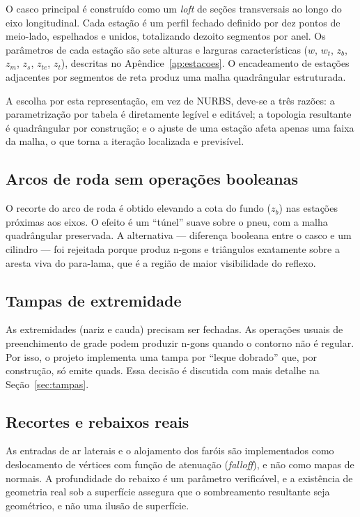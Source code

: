 O casco principal \'e constru\'ido como um \emph{loft} de se{\c{c}}\~oes transversais ao longo do
eixo longitudinal. Cada esta{\c{c}}\~ao \'e um perfil fechado definido por dez pontos de
meio-lado, espelhados e unidos, totalizando dezoito segmentos por anel. Os par\^ametros de cada
esta{\c{c}}\~ao s\~ao sete alturas e larguras caracter\'isticas ($w$, $w_t$, $z_b$, $z_m$,
$z_s$, $z_{te}$, $z_t$), descritas no Ap\^endice~\ref{ap:estacoes}. O encadeamento de
esta{\c{c}}\~oes adjacentes por segmentos de reta produz uma malha quadr\^angular
estruturada.

A escolha por esta representa{\c{c}}\~ao, em vez de NURBS, deve-se a tr\^es raz\~oes: a
parametriza{\c{c}}\~ao por tabela \'e diretamente leg\'ivel e edit\'avel; a topologia
resultante \'e quadr\^angular por constru{\c{c}}\~ao; e o ajuste de uma esta{\c{c}}\~ao afeta
apenas uma faixa da malha, o que torna a itera{\c{c}}\~ao localizada e previs\'ivel.

\subsection{Arcos de roda sem opera{\c{c}}\~oes booleanas}

O recorte do arco de roda \'e obtido elevando a cota do fundo ($z_b$) nas esta{\c{c}}\~oes
pr\'oximas aos eixos. O efeito \'e um ``t\'unel'' suave sobre o pneu, com a malha
quadr\^angular preservada. A alternativa --- diferen{\c{c}}a booleana entre o casco e um cilindro
--- foi rejeitada porque produz n-gons e tri\^angulos exatamente sobre a aresta viva do
para-lama, que \'e a regi\~ao de maior visibilidade do reflexo.

\subsection{Tampas de extremidade}

As extremidades (nariz e cauda) precisam ser fechadas. As opera{\c{c}}\~oes usuais de
preenchimento de grade podem produzir n-gons quando o contorno n\~ao \'e regular. Por isso, o
projeto implementa uma tampa por ``leque dobrado'' que, por constru{\c{c}}\~ao, s\'o emite
quads. Essa decis\~ao \'e discutida com mais detalhe na Se{\c{c}}\~ao~\ref{sec:tampas}.

\subsection{Recortes e rebaixos reais}

As entradas de ar laterais e o alojamento dos far\'ois s\~ao implementados como deslocamento de
v\'ertices com fun{\c{c}}\~ao de atenua{\c{c}}\~ao (\emph{falloff}), e n\~ao como mapas de
normais. A profundidade do rebaixo \'e um par\^ametro verific\'avel, e a exist\^encia de
geometria real sob a superf\'icie assegura que o sombreamento resultante seja
geom\'etrico, e n\~ao uma ilus\~ao de superf\'icie.

